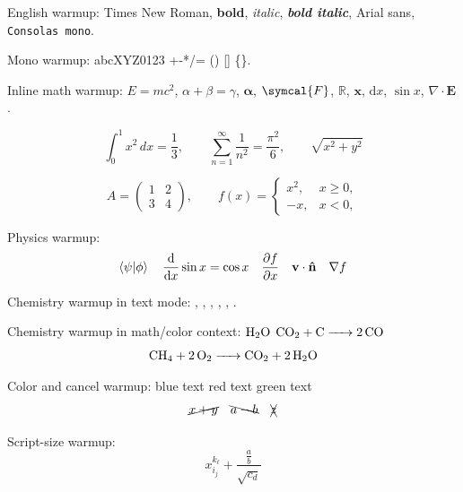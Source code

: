 


\begin{preview}

English warmup: Times New Roman, \textbf{bold}, \textit{italic},
\textbf{\textit{bold italic}}, \textsf{Arial sans}, \texttt{Consolas mono}.

{\ttfamily Mono warmup: abcXYZ0123 +-*/= () [] \{\}.}

Inline math warmup:
$E=mc^2$, $\alpha+\beta=\gamma$, $\symbf{\alpha}$, $\symcal{F}$,
$\mathbb{R}$, $\mathbf{x}$, $\mathrm{d}x$, $\sin x$, $\nabla\cdot\mathbf{E}$.

\[
  \int_0^1 x^2\,dx = \frac{1}{3},\qquad
  \sum_{n=1}^{\infty}\frac{1}{n^2}=\frac{\pi^2}{6},\qquad
  \sqrt{x^2+y^2}
\]

\[
  A =
  \begin{pmatrix}
    1 & 2\\
    3 & 4
  \end{pmatrix},
  \qquad
  f(x)=
  \begin{cases}
    x^2, & x \ge 0,\\
    -x,  & x < 0,
  \end{cases}
\]

Physics warmup:
\[
  \ip{\psi}{\phi}\quad
  \dv{x}\sin x=\cos x\quad
  \pdv{f}{x}\quad
  \vb{v}\cdot\vu{n}\quad
  \nabla f
\]

Chemistry warmup in text mode:
, , , , , .

Chemistry warmup in math/color context:
{\color{blue}$\ce{H2O}$}
{\color{red}$\ce{CO2 + C -> 2CO}$}
\[
  \ce{CH4 + 2O2 -> CO2 + 2H2O}
\]

Color and cancel warmup:
{\color{blue}blue text}
{\color{red}red text}
{\color{green!50!black}green text}
\[
  \cancel{x+y}\quad \bcancel{a-b}\quad \xcancel{z}
\]

Script-size warmup:
\[
  x_{i_j}^{k_\ell} + \frac{\frac{a}{b}}{\sqrt{c_d}}
\]

\end{preview}

